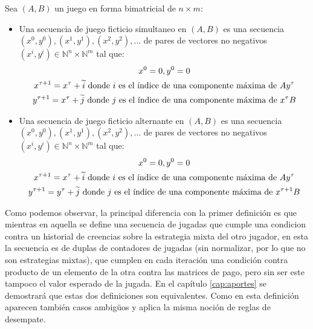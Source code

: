 \begin{definition} \label{def:fp:brandt}
    Sea $(A, B)$ un juego en forma bimatricial de $n \times m$:
    \begin{itemize}
        \item Una secuencia de juego ficticio simultaneo en $(A, B)$ es una secuencia $(x^0, y^0), (x^1, y^1), (x^2, y^2), \dots$ de pares de vectores no negativos $(x^i, y^i) \in \mathbb{N}^n \times \mathbb{N}^m$ tal que:
        \begin{gather*}
            x^0 = \boldmath{0}, y^0 = \boldmath{0} \\
            x^{\tau+1} = x^{\tau} + \widetilde{i} \text{\ donde $i$ es el índice de una componente máxima de $Ay^\tau$} \\
            y^{\tau+1} = x^{\tau} + \widetilde{j} \text{\ donde $j$ es el índice de una componente máxima de $x^{\tau}B$}
        \end{gather*}
        \item Una secuencia de juego ficticio alternante en $(A, B)$ es una secuencia $(x^0, y^0), (x^1, y^1), (x^2, y^2), \dots$ de pares de vectores no negativos $(x^i, y^i) \in \mathbb{N}^n \times \mathbb{N}^m$ tal que:
        \begin{gather*}
            x^0 = \boldmath{0}, y^0 = \boldmath{0} \\
            x^{\tau+1} = x^{\tau} + \widetilde{i} \text{\ donde $i$ es el índice de una componente máxima de $Ay^\tau$} \\
            y^{\tau+1} = y^{\tau} + \widetilde{j} \text{\ donde $j$ es el índice de una componente máxima de $x^{\tau+1}B$}
        \end{gather*}
    \end{itemize}
\end{definition}

Como podemos observar, la principal diferencia con la primer definición es que mientras en aquella se define una secuencia de jugadas que cumple una condicion contra un historial de creencias sobre la estrategia mixta del otro jugador, en esta la secuencia es de duplas de contadores de jugadas (sin normalizar, por lo que no son estrategias mixtas), que cumplen en cada iteración una condición contra producto de un elemento de la otra contra las matrices de pago, pero sin ser este tampoco el valor esperado de la jugada. En el capítulo \ref{cap:aportes} se demostrará que estas dos definiciones son equivalentes. Como en esta definición aparecen también casos ambigüos y aplica la misma noción de reglas de desempate.

